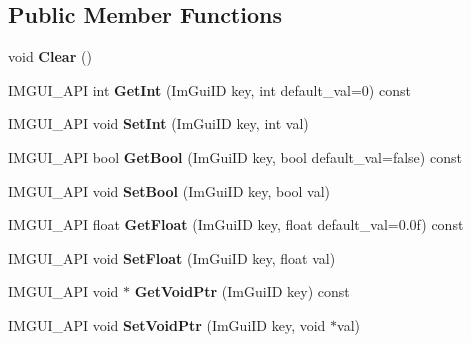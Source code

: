 \subsection*{Public Member Functions}
\begin{DoxyCompactItemize}
\item 
\mbox{\label{structImGuiStorage_a72ceecfbca3d08df8c2a232b77890c20}} 
void {\bfseries Clear} ()
\item 
\mbox{\label{structImGuiStorage_ac86b64f5c69a15de6c6c326963eca64a}} 
I\+M\+G\+U\+I\+\_\+\+A\+PI int {\bfseries Get\+Int} (Im\+Gui\+ID key, int default\+\_\+val=0) const
\item 
\mbox{\label{structImGuiStorage_af83975ca841a9bd0e06a6ea0a41bf159}} 
I\+M\+G\+U\+I\+\_\+\+A\+PI void {\bfseries Set\+Int} (Im\+Gui\+ID key, int val)
\item 
\mbox{\label{structImGuiStorage_a22d34ae6278f86468a3e7df8fbd1b632}} 
I\+M\+G\+U\+I\+\_\+\+A\+PI bool {\bfseries Get\+Bool} (Im\+Gui\+ID key, bool default\+\_\+val=false) const
\item 
\mbox{\label{structImGuiStorage_ac5beee31a59b3f5294b41992717be7bf}} 
I\+M\+G\+U\+I\+\_\+\+A\+PI void {\bfseries Set\+Bool} (Im\+Gui\+ID key, bool val)
\item 
\mbox{\label{structImGuiStorage_a0f51ef327f7e548d003b0e006967c1eb}} 
I\+M\+G\+U\+I\+\_\+\+A\+PI float {\bfseries Get\+Float} (Im\+Gui\+ID key, float default\+\_\+val=0.\+0f) const
\item 
\mbox{\label{structImGuiStorage_ab531d90a0e5a1a2453e351c499149756}} 
I\+M\+G\+U\+I\+\_\+\+A\+PI void {\bfseries Set\+Float} (Im\+Gui\+ID key, float val)
\item 
\mbox{\label{structImGuiStorage_aaf87a98ede89da09113b0189f6d878ca}} 
I\+M\+G\+U\+I\+\_\+\+A\+PI void $\ast$ {\bfseries Get\+Void\+Ptr} (Im\+Gui\+ID key) const
\item 
\mbox{\label{structImGuiStorage_a55f840086b3ec9cf63c67f02d159204a}} 
I\+M\+G\+U\+I\+\_\+\+A\+PI void {\bfseries Set\+Void\+Ptr} (Im\+Gui\+ID key, void $\ast$val)

\end{DoxyCompactItemize}

